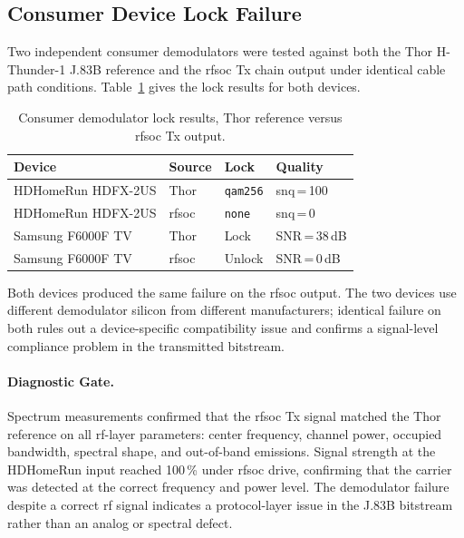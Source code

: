 \subsection{Consumer Device Lock Failure}
\label{subsec:lock_failure}

Two independent consumer demodulators were tested against both the
Thor H-Thunder-1 J.83B reference and the \ac{rfsoc} Tx chain
output under identical cable path conditions.
Table~\ref{tab:device_lock} gives the lock results for both devices.

\begin{table}[htbp]
  \caption{Consumer demodulator lock results, Thor reference versus
           \ac{rfsoc} Tx output.}
  \label{tab:device_lock}
  \centering
  \small
  \begin{tabular}{llll}
    \hline
    Device & Source & Lock & Quality \\
    \hline
    HDHomeRun HDFX-2US & Thor       & \texttt{qam256} & snq\,=\,100       \\[2pt]
    HDHomeRun HDFX-2US & \ac{rfsoc} & \texttt{none}   & snq\,=\,0         \\[2pt]
    Samsung F6000F TV  & Thor       & Lock            & SNR\,=\,38\,dB    \\[2pt]
    Samsung F6000F TV  & \ac{rfsoc} & Unlock          & SNR\,=\,0\,dB     \\
    \hline
  \end{tabular}
\end{table}

\FloatBarrier

Both devices produced the same failure on the \ac{rfsoc} output.
The two devices use different demodulator silicon from different
manufacturers; identical failure on both rules out a
device-specific compatibility issue and confirms a signal-level
compliance problem in the transmitted bitstream.


\paragraph{Diagnostic Gate.}
\leavevmode\par

Spectrum measurements confirmed that the \ac{rfsoc} Tx signal
matched the Thor reference on all \ac{rf}-layer parameters: center
frequency, channel power, occupied bandwidth, spectral shape, and
out-of-band emissions.
Signal strength at the HDHomeRun input reached 100\,\% under
\ac{rfsoc} drive, confirming that the carrier was detected at the
correct frequency and power level.
The demodulator failure despite a correct \ac{rf} signal indicates
a protocol-layer issue in the J.83B bitstream rather than an analog
or spectral defect.

